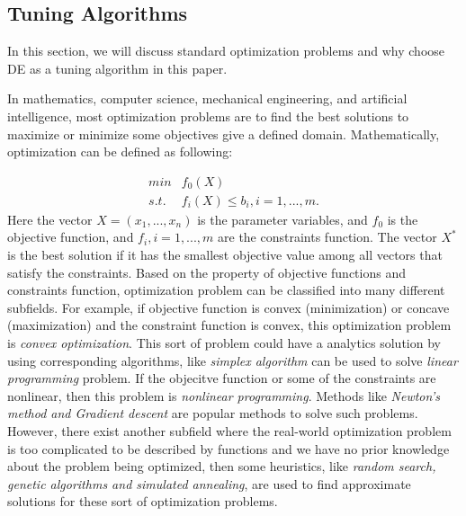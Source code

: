 


\subsection{Tuning Algorithms}
In this section, we will discuss standard optimization problems and why choose DE as
a tuning algorithm in this paper.

In mathematics, computer science, mechanical engineering, and artificial intelligence,  most optimization
problems are to find the best solutions to maximize or minimize some objectives give a defined domain.
Mathematically, optimization can be defined as following:

\begin{equation}\label{eq1}
  \begin{array}{ll}
    min  & f_0(X) \\
    s.t. & f_i(X) \leq b_i, i=1,...,m.
  \end{array}
\end{equation}
Here the vector $X = (x_1,...,x_n)$ is the parameter variables, and $f_0$ is the objective function,
and $f_i, i=1,...,m$ are the constraints function. The vector $X^*$ is the best solution if it has the 
smallest objective value among all vectors that satisfy the constraints\cite{boyd2004convex}.
Based on the property of objective functions and constraints function, optimization problem
can be classified into many different subfields. For example, if objective function
is convex (minimization) or concave (maximization) and the constraint function is convex, 
this optimization problem is {\em convex optimization}. This sort of problem 
could have a analytics solution by using corresponding algorithms, like {\em simplex algorithm}
can be used to solve {\em linear programming} problem. If the objecitve function or some of 
the constraints are nonlinear, then this problem is {\em nonlinear programming}.
Methods like {\em Newton's method and Gradient descent} are popular methods to solve such problems.
However, there exist another subfield where the real-world optimization problem is too complicated to
be described by functions and we have no prior knowledge about the problem being optimized, then
some heuristics, like {\em random search, genetic algorithms and simulated annealing},
are used to find approximate solutions for these sort of optimization problems.

